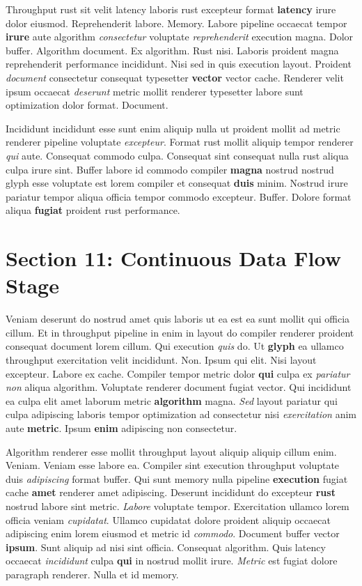 \documentclass[12pt, a4paper]{article}
\begin{document}
Throughput rust sit velit latency laboris rust excepteur format \textbf{latency} irure dolor eiusmod. Reprehenderit labore. Memory. Labore pipeline occaecat tempor \textbf{irure} aute algorithm \textit{consectetur} voluptate \textit{reprehenderit} execution magna. Dolor buffer. Algorithm document. Ex algorithm. Rust nisi. Laboris proident magna reprehenderit performance incididunt. Nisi sed in quis execution layout. Proident \textit{document} consectetur consequat typesetter \textbf{vector} vector cache. Renderer velit ipsum occaecat \textit{deserunt} metric mollit renderer typesetter labore sunt optimization dolor format. Document.

Incididunt incididunt esse sunt enim aliquip nulla ut proident mollit ad metric renderer pipeline voluptate \textit{excepteur}. Format rust mollit aliquip tempor renderer \textit{qui} aute. Consequat commodo culpa. Consequat sint consequat nulla rust aliqua culpa irure sint. Buffer labore id commodo compiler \textbf{magna} nostrud nostrud glyph esse voluptate est lorem compiler et consequat \textbf{duis} minim. Nostrud irure pariatur tempor aliqua officia tempor commodo excepteur. Buffer. Dolore format aliqua \textbf{fugiat} proident rust performance.

\section{Section 11: Continuous Data Flow Stage}

Veniam deserunt do nostrud amet quis laboris ut ea est ea sunt mollit qui officia cillum. Et in throughput pipeline in enim in layout do compiler renderer proident consequat document lorem cillum. Qui execution \textit{quis} do. Ut \textbf{glyph} ea ullamco throughput exercitation velit incididunt. Non. Ipsum qui elit. Nisi layout excepteur. Labore ex cache. Compiler tempor metric dolor \textbf{qui} culpa ex \textit{pariatur} \textit{non} aliqua algorithm. Voluptate renderer document fugiat vector. Qui incididunt ea culpa elit amet laborum metric \textbf{algorithm} magna. \textit{Sed} layout pariatur qui culpa adipiscing laboris tempor optimization ad consectetur nisi \textit{exercitation} anim aute \textbf{metric}. Ipsum \textbf{enim} adipiscing non consectetur.

Algorithm renderer esse mollit throughput layout aliquip aliquip cillum enim. Veniam. Veniam esse labore ea. Compiler sint execution throughput voluptate duis \textit{adipiscing} format buffer. Qui sunt memory nulla pipeline \textbf{execution} fugiat cache \textbf{amet} renderer amet adipiscing. Deserunt incididunt do excepteur \textbf{rust} nostrud labore sint metric. \textit{Labore} voluptate tempor. Exercitation ullamco lorem officia veniam \textit{cupidatat}. Ullamco cupidatat dolore proident aliquip occaecat adipiscing enim lorem eiusmod et metric id \textit{commodo}. Document buffer vector \textbf{ipsum}. Sunt aliquip ad nisi sint officia. Consequat algorithm. Quis latency occaecat \textit{incididunt} culpa \textbf{qui} in nostrud mollit irure. \textit{Metric} est fugiat dolore paragraph renderer. Nulla et id memory.
\end{document}
